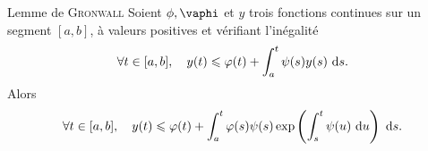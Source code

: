 \begin{box_titre}{Lemme de \textsc{Gronwall}}
    Soient $\phi, \vaphi$ et $y$ trois fonctions continues sur un segment $[a, b]$, à valeurs positives et vérifiant l'inégalité 
    $$\forall t \in [a, b], \quad y(t) \leqslant \varphi(t) + \int_{a}^{t} \psi(s) y(s)\ \mathrm{d} s.$$
    Alors
    $$ \forall t \in [a, b], \quad y(t) \leqslant \varphi(t) + \int_{a}^{t} \varphi(s) \psi(s) \exp \left( \int_{s}^{t} \psi(u)\ \mathrm{d} u \right)\ \mathrm{d} s.$$
\end{box_titre}